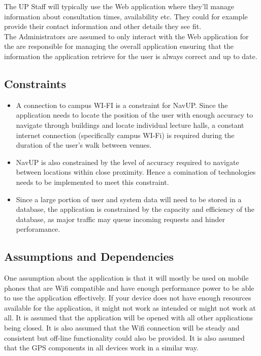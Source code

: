 \documentclass[12pt]{article}
\begin{document}
	The UP Staff will typically use the Web application where they'll manage information about consultation times, availability etc. They could for example provide their contact information and other details they see fit.\\
	
	The Administrators are assumed to only interact with the Web application for the are responsible for managing the overall application ensuring that the information the application retrieve for the user is always correct and up to date.
	\subsection{Constraints}
	\begin{itemize}
		\item A connection to campus WI-FI is a constraint for NavUP. Since the application needs to locate the position of the user with enough accuracy to navigate through buildings and locate individual lecture halls, a constant internet connection (specifically campus WI-Fi) is required during the duration of the user’s walk between venues.
		\item NavUP is also constrained by the level of accuracy required to navigate between locations within close proximity. Hence a comination of technologies needs to be implemented to meet this constraint.
		\item Since a large portion of user and system data will need to be stored in a database, the application is constrained by the capacity and efficiency of the database, as major traffic may queue incoming requests and hinder perforamance.
	\end{itemize}
	
	\subsection{Assumptions and Dependencies}
	One assumption about the application is that it will mostly be used on mobile phones that are Wifi compatible and have enough performance power to be able to use the application effectively. If your device does not have enough resources available for the application, it might not work as intended or might not work at all. It is assumed that the application will be opened with all other applications being closed. It is also assumed that the Wifi connection will be steady and consistent but off-line functionality could also be provided. It is also assumed that the GPS components in all devices work in a similar way.
\end{document}
